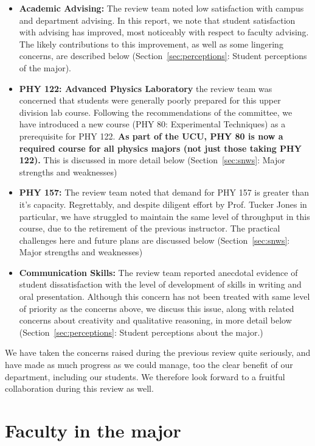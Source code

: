 \documentclass[12pt]{article}
\begin{document}
\begin{itemize}
\item {\bf Academic Advising:} The review team noted low satisfaction
  with campus and department advising.  In this report, we note that
  student satisfaction with advising has improved, most noticeably with
  respect to faculty advising.  The likely contributions to this
  improvement, as well as some lingering concerns, are described below
  (Section~\ref{sec:perceptions}: Student perceptions of the major).

\item {\bf PHY 122: Advanced Physics Laboratory} the review team was
  concerned that students were generally poorly prepared for this
  upper division lab course.  Following the recommendations of the
  committee, we have introduced a new course (PHY 80: Experimental Techniques) as a prerequisite for PHY 122.  {\bf As part of the UCU, PHY 80 is now a required course for all physics majors (not just those taking PHY 122).}  This is discussed in more detail below (Section~\ref{sec:snws}: Major strengths and weaknesses)
  
\item {\bf PHY 157:}
  The review team noted that demand for PHY 157 is greater than it's
  capacity.  Regrettably, and despite diligent effort by Prof. Tucker Jones in particular, we have struggled to  maintain the same level of throughput in this course, due to the retirement of the previous instructor.  The practical challenges here and future plans are discussed below (Section~\ref{sec:snws}: Major strengths and weaknesses)

\item {\bf Communication Skills:} The review team reported anecdotal
  evidence of student dissatisfaction with the level of development of
  skills in writing and oral presentation.  Although this concern has
  not been treated with same level of priority as the concerns above,
  we discuss this issue, along with related concerns about creativity
  and qualitative reasoning, in more detail below
  (Section~\ref{sec:perceptions}: Student perceptions about the
  major.)

\end{itemize}

We have taken the concerns raised during the previous review quite
seriously, and have made as much progress as we could manage, too the
clear benefit of our department, including our students.  We therefore
look forward to a fruitful collaboration during this review as well.


\section{Faculty in the major}
\label{sec:faculty}
\end{document}
